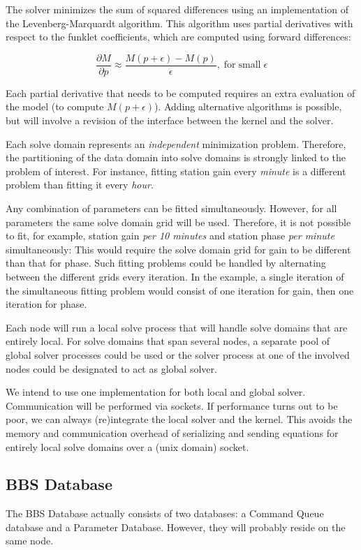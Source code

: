 \documentclass[10pt]{lofar}
\begin{document}
The solver minimizes the sum of squared differences using an implementation of
the Levenberg-Marquardt algorithm. This algorithm uses partial derivatives with
respect to the funklet coefficients, which are computed using forward
differences:

\[
\frac{\partial M}{\partial p} \approx \frac{M(p + \epsilon) -
M(p)}{\epsilon}\mathrm{,}\;\mathrm{for}\;\mathrm{small}\;\epsilon
\]

Each partial derivative that needs to be computed requires an extra evaluation
of the model (to compute $M(p + \epsilon)$). Adding alternative algorithms is
possible, but will involve a revision of the interface between the kernel and
the solver.

Each solve domain represents an \emph{independent} minimization problem.
Therefore, the partitioning of the data domain into solve domains is strongly
linked to the problem of interest. For instance, fitting station gain every
\emph{minute} is a different problem than fitting it every \emph{hour}.

Any combination of parameters can be fitted simultaneously. However, for all
parameters the same solve domain grid will be used. Therefore, it is not
possible to fit, for example, station gain \emph{per 10 minutes} and station
phase \emph{per minute} simultaneously: This would require the solve domain grid
for gain to be different than that for phase. Such fitting problems could be
handled by alternating between the different grids every iteration. In the
example, a single iteration of the simultaneous fitting problem would consist
of one iteration for gain, then one iteration for phase.

Each node will run a local solve process that will handle solve domains that are
entirely local. For solve domains that span several nodes, a separate pool of
global solver processes could be used or the solver process at one of the
involved nodes could be designated to act as global solver.

We intend to use one implementation for both local and global solver.
Communication will be performed via sockets. If performance turns out to be
poor, we can always (re)integrate the local solver and the kernel. This avoids
the memory and communication overhead of serializing and sending equations for
entirely local solve domains over a (unix domain) socket.

\subsection{BBS Database}
\label{subsec:design-database}
The BBS Database actually consists of two databases: a Command Queue database
and a Parameter Database. However, they will probably reside on the same node.
\end{document}

